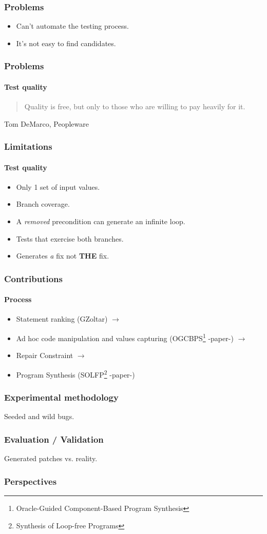 \documentclass{beamer}
\begin{document}
  \frame
  {
    \frametitle{Problems}
\begin{itemize}
\item Can't automate the testing process.
\item It's not easy to find candidates.
\end{itemize}    
  }

  \frame
  {
    \frametitle{Problems}
    \framesubtitle{Test quality}
   \begin{quote}
    Quality is free, but only to those who are willing to pay heavily for it.
   \end{quote}
    Tom DeMarco, Peopleware   
  }
  
     
%    
%    
%    
%    

 
  \frame
  {
    \frametitle{Limitations}
    \framesubtitle{Test quality}
\begin{itemize}
\item Only 1 set of input values.
\item Branch coverage.
\item A \textit{removed} precondition can generate an infinite loop.
\item Tests that exercise both branches.
\item Generates \textit{a} fix not \textbf{THE} fix.
\end{itemize}        
  }

  \frame
  {  
    \frametitle{Contributions}
      \framesubtitle{Process}
\begin{itemize}
\item Statement ranking (GZoltar)  $\rightarrow$
\item Ad hoc code manipulation and values capturing (OGCBPS\footnote{Oracle-Guided Component-Based Program Synthesis} -paper-) $\rightarrow$
\item Repair Constraint  $\rightarrow$
\item Program Synthesis (SOLFP\footnote{Synthesis of Loop-free Programs} -paper-)
\end{itemize}
}


  \frame
  {
    \frametitle{Experimental methodology}
    Seeded and wild bugs.
  }
  
  \frame
  {
    \frametitle{Evaluation / Validation}
    Generated patches vs. reality.
  }
  
  \frame
  {
    \frametitle{Perspectives}
    
  }
  
\end{document}

